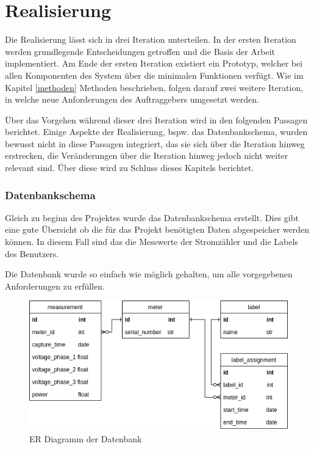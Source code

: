 \chapter{Realisierung}


Die Realisierung lässt sich in drei Iteration unterteilen.
In der ersten Iteration werden grundlegende Entscheidungen getroffen und die Basis der Arbeit implementiert.
Am Ende der ersten Iteration existiert ein Prototyp,
welcher bei allen Komponenten des System über die minimalen Funktionen verfügt.
Wie im Kapitel \ref{methoden} Methoden beschrieben, folgen darauf zwei weitere Iteration,
in welche neue Anforderungen des Auftraggebers umgesetzt werden.

Über das Vorgehen während dieser drei Iteration wird in den folgenden Passagen berichtet.
Einige Aspekte der Realisierung, bspw. das Datenbankschema,  wurden bewusst nicht in diese Passagen integriert,
das sie sich über die Iteration hinweg erstrecken,
die Veränderungen über die Iteration hinweg jedoch nicht weiter relevant sind.
Über diese wird zu Schluss dieses Kapitels berichtet.
\newpage

\newpage

\newpage

\newpage

\subsection{Datenbankschema}

Gleich zu beginn des Projektes wurde das Datenbankschema erstellt.
Dies gibt eine gute Übersicht ob die für das Projekt benötigten Daten
abgespeicher werden können. In diesem Fall sind das die Messwerte der Stromzähler
und die Labels des Benutzers.

Die Datenbank wurde so einfach wie möglich gehalten, um alle vorgegebenen
Anforderungen zu erfüllen.

\begin{figure}[H]
    \centering
    \includegraphics[width=1.0\textwidth]{gfx/smic-db}
    \caption{
        ER Diagramm der Datenbank
    }
    \label{fig:smic-db}
\end{figure}

